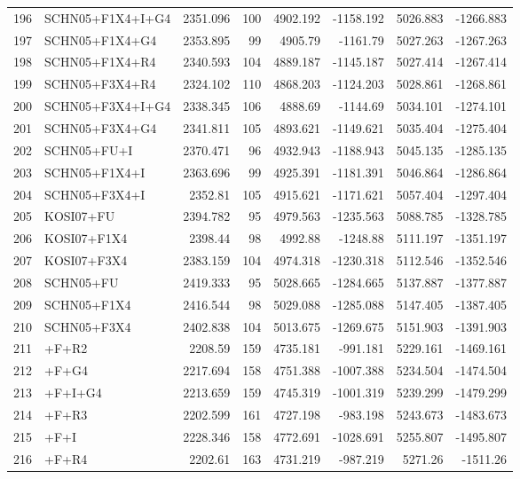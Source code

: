 \documentclass[12pt]{article}
\begin{document}
\begin{longtable}{clrrrrrr}
	196 & SCHN05+F1X4+I+G4 & 2351.096 & 100 & 4902.192 & -1158.192 & 5026.883 & -1266.883 \\ 
	197 & SCHN05+F1X4+G4 & 2353.895 & 99 & 4905.79 & -1161.79 & 5027.263 & -1267.263 \\ 
	198 & SCHN05+F1X4+R4 & 2340.593 & 104 & 4889.187 & -1145.187 & 5027.414 & -1267.414 \\ 
	199 & SCHN05+F3X4+R4 & 2324.102 & 110 & 4868.203 & -1124.203 & 5028.861 & -1268.861 \\ 
	200 & SCHN05+F3X4+I+G4 & 2338.345 & 106 & 4888.69 & -1144.69 & 5034.101 & -1274.101 \\ 
	201 & SCHN05+F3X4+G4 & 2341.811 & 105 & 4893.621 & -1149.621 & 5035.404 & -1275.404 \\ 
	202 & SCHN05+FU+I & 2370.471 & 96 & 4932.943 & -1188.943 & 5045.135 & -1285.135 \\ 
	203 & SCHN05+F1X4+I & 2363.696 & 99 & 4925.391 & -1181.391 & 5046.864 & -1286.864 \\ 
	204 & SCHN05+F3X4+I & 2352.81 & 105 & 4915.621 & -1171.621 & 5057.404 & -1297.404 \\ 
	205 & KOSI07+FU & 2394.782 & 95 & 4979.563 & -1235.563 & 5088.785 & -1328.785 \\ 
	206 & KOSI07+F1X4 & 2398.44 & 98 & 4992.88 & -1248.88 & 5111.197 & -1351.197 \\ 
	207 & KOSI07+F3X4 & 2383.159 & 104 & 4974.318 & -1230.318 & 5112.546 & -1352.546 \\ 
	208 & SCHN05+FU & 2419.333 & 95 & 5028.665 & -1284.665 & 5137.887 & -1377.887 \\ 
	209 & SCHN05+F1X4 & 2416.544 & 98 & 5029.088 & -1285.088 & 5147.405 & -1387.405 \\ 
	210 & SCHN05+F3X4 & 2402.838 & 104 & 5013.675 & -1269.675 & 5151.903 & -1391.903 \\ 
	211 & \gy+F+R2 & 2208.59 & 159 & 4735.181 & -991.181 & 5229.161 & -1469.161 \\ 
	212 & \gy+F+G4 & 2217.694 & 158 & 4751.388 & -1007.388 & 5234.504 & -1474.504 \\ 
	213 & \gy+F+I+G4 & 2213.659 & 159 & 4745.319 & -1001.319 & 5239.299 & -1479.299 \\ 
	214 & \gy+F+R3 & 2202.599 & 161 & 4727.198 & -983.198 & 5243.673 & -1483.673 \\ 
	215 & \gy+F+I & 2228.346 & 158 & 4772.691 & -1028.691 & 5255.807 & -1495.807 \\ 
	216 & \gy+F+R4 & 2202.61 & 163 & 4731.219 & -987.219 & 5271.26 & -1511.26 \\ 

\end{longtable}
\end{document}
